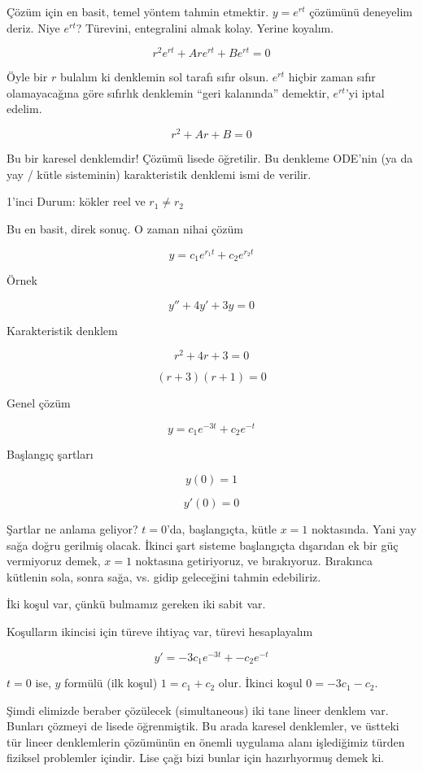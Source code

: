 \documentclass[12pt,fleqn]{article}\usepackage{../../common}
\begin{document}
Çözüm için en basit, temel yöntem tahmin etmektir. $y = e^{rt}$ çözümünü
deneyelim deriz. Niye $e^{rt}$? Türevini, entegralini almak kolay. Yerine
koyalım.

$$ r^2e^{rt} + Are^{rt} + Be^{rt} = 0 $$

Öyle bir $r$ bulalım ki denklemin sol tarafı sıfır olsun. $e^{rt}$ hiçbir zaman
sıfır olamayacağına göre sıfırlık denklemin ``geri kalanında'' demektir,
$e^{rt}$'yi iptal edelim.

$$ r^2 + Ar + B = 0 $$

Bu bir karesel denklemdir! Çözümü lisede öğretilir. Bu denkleme ODE'nin (ya da
yay / kütle sisteminin) karakteristik denklemi ismi de verilir.

1'inci Durum: kökler reel ve $r_1 \ne r_2$

Bu en basit, direk sonuç. O zaman nihai çözüm

$$ y = c_1 e^{r_1t} + c_2  e^{r_2t}$$

Örnek

$$ y'' + 4y' + 3y = 0 $$

Karakteristik denklem

$$ r^2 + 4r + 3 = 0 $$

$$ (r+3)(r+1) = 0 $$

Genel çözüm

$$ y = c_1e^{-3t} + c_2e^{-t} $$

Başlangıç şartları 

$$ y(0) = 1 $$

$$ y'(0) = 0 $$

Şartlar ne anlama geliyor? $t=0$'da, başlangıçta, kütle $x=1$ noktasında. Yani
yay sağa doğru gerilmiş olacak. İkinci şart sisteme başlangıçta dışarıdan ek bir
güç vermiyoruz demek, $x=1$ noktasına getiriyoruz, ve bırakıyoruz. Bırakınca
kütlenin sola, sonra sağa, vs. gidip geleceğini tahmin edebiliriz.

İki koşul var, çünkü bulmamız gereken iki sabit var. 

Koşulların ikincisi için türeve ihtiyaç var, türevi hesaplayalım

$$ y' = -3c_1e^{-3t} + - c_2 e^{-t} $$

$t = 0$ ise, $y$ formülü (ilk koşul) $1 = c_1 + c_2$ olur. İkinci koşul
$0 = -3c_1 - c_2$. 

Şimdi elimizde beraber çözülecek (simultaneous) iki tane lineer denklem
var. Bunları çözmeyi de lisede öğrenmiştik. Bu arada karesel denklemler, ve
üstteki tür lineer denklemlerin çözümünün en önemli uygulama alanı işlediğimiz
türden fiziksel problemler içindir. Lise çağı bizi bunlar için hazırlıyormuş
demek ki.
\end{document}
